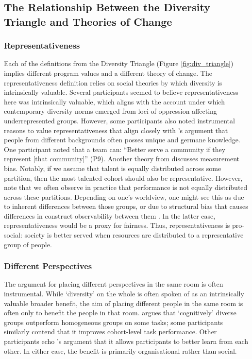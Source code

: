 \subsection{The Relationship Between the Diversity Triangle and Theories of Change}
\subsubsection{Representativeness}
Each of the definitions from the Diversity Triangle (Figure \ref{fig:div_triangle}) implies different program values and a different theory of change. The representativeness
definition relies on social theories by which diversity is intrinsically valuable. Several participants seemed to believe representativeness here was intrinsically valuable, which aligns with the \textcite{morris1984origins} account under which contemporary diversity norms emerged from loci of oppression affecting underrepresented groups. However, some participants also noted instrumental reasons to value representativeness that align closely with \textcite{peters2021hidden,page_difference_2007}'s argument that people from different backgrounds often posses unique and germane knowledge. One participant noted that a team can: ``Better serve a community if they represent [that community]'' (P9). Another theory from \textcite{Friedler_Scheidegger_Venkatasubramanian_2016} discusses measurement bias. Notably, if we assume that talent is equally distributed across some partition, then the most talented cohort should also be representative. However, \textcite{Friedler_Scheidegger_Venkatasubramanian_2016} note that we often observe in practice that performance is not equally distributed across these partitions. Depending on one's worldview, one might see this as due to inherent differences between those groups, or due to structural bias that causes differences in construct observability between them \cite{Friedler_Scheidegger_Venkatasubramanian_2016}. In the latter case, representativeness would be a proxy for fairness. Thus, representativeness is pro-social: society is better served when resources are distributed to a representative group of people.

\subsubsection{Different Perspectives}
The argument for placing different perspectives in the same room is often instrumental. While `diversity' on the whole is often spoken of as an intrinsically valuable broader benefit, the aim of placing different people in the same room is often only to benefit the people in that room. \textcite{page_diversity_2010} argues that `cognitively' diverse groups outperform homogeneous groups on some tasks; some participants similarly contend that it improves cohort-level task performance. Other participants echo \textcite{wylie2006introduction}'s argument that it allows participants to better learn from each other. In either case, the benefit is primarily organisational rather than social.

